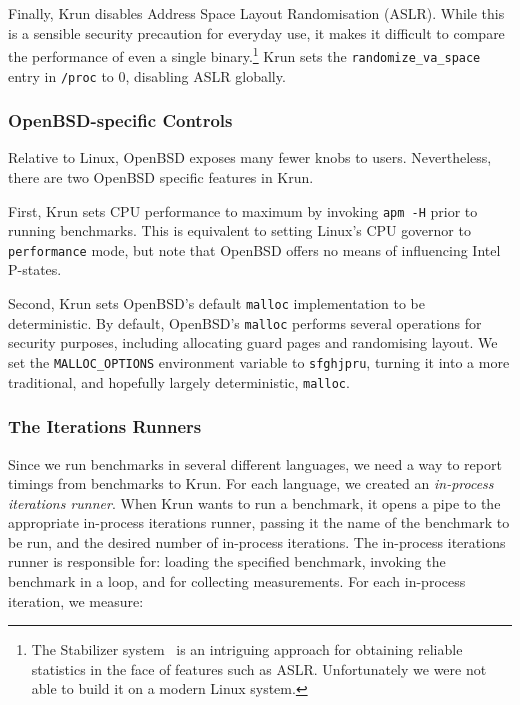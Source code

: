 \documentclass[preprint,numbers,10pt]{sigplanconf}
\newcommand{\krun}{Krun\xspace}
\begin{document}
Finally, \krun disables Address Space Layout Randomisation (ASLR). While this is
a sensible security precaution for everyday use, it makes it difficult to
compare the performance of even a single binary.\footnote{The Stabilizer
system~\cite{curtsinger13stabilizer} is an intriguing approach for obtaining reliable
statistics in the face of features such as ASLR. Unfortunately we were not able
to build it on a modern Linux system.} \krun sets the
\texttt{randomize\_va\_space} entry in \texttt{/proc} to 0, disabling ASLR
globally.


\subsubsection{OpenBSD-specific Controls}

Relative to Linux, OpenBSD exposes many fewer knobs to users. Nevertheless,
there are two OpenBSD specific features in \krun.

First, \krun sets CPU performance to maximum by invoking \texttt{apm -H} prior
to running benchmarks. This is equivalent to setting Linux's CPU governor to
\texttt{performance} mode, but note that OpenBSD offers no means of influencing
Intel P-states.

Second, \krun sets OpenBSD's default \texttt{malloc} implementation to be
deterministic. By default, OpenBSD's \texttt{malloc} performs several operations
for security purposes, including allocating guard pages and randomising layout.
We set the \texttt{MALLOC\_OPTIONS} environment variable to \texttt{sfghjpru},
turning it into a more traditional, and hopefully largely deterministic,
\texttt{malloc}.


\subsubsection{The Iterations Runners}

Since we run benchmarks in several different languages, we need a way to report
timings from benchmarks to \krun. For each language, we created an
\emph{in-process iterations runner}. When \krun wants to run a benchmark, it opens a pipe to the
appropriate in-process iterations runner, passing it the name of the
benchmark to be run, and the desired number of in-process iterations. The
in-process iterations runner is responsible for: loading the specified
benchmark, invoking the benchmark in a loop, and for collecting measurements.
For each in-process iteration, we measure:
\end{document}
